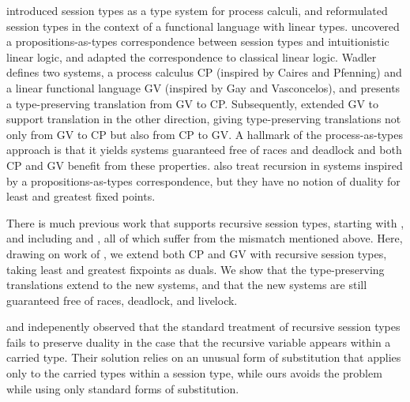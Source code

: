 \documentclass[orivec,envcountsame]{llncs}
\begin{document}
\citet{Honda93} introduced session types as a type system for process calculi, and
\citet{GayVasconcelos10} reformulated session types in the context of a functional language with
linear types. \citet{CairesPfenning10} uncovered a propositions-as-types correspondence between
session types and intuitionistic linear logic, and \citet{Wadler12} adapted the correspondence to
classical linear logic. Wadler defines two systems, a process calculus CP (inspired by Caires and
Pfenning) and a linear functional language GV (inspired by Gay and Vasconcelos), and presents a
type-preserving translation from GV to CP. Subsequently, \citet{LindleyM14} extended GV to support
translation in the other direction, giving type-preserving translations not only from GV to CP but
also from CP to GV. A hallmark of the process-as-types approach is that it yields systems guaranteed
free of races and deadlock and both CP and GV benefit from these properties.
\citet{Toninho13,Toninho14} also treat recursion in systems inspired by a propositions-as-types
correspondence, but they have no notion of duality for least and greatest fixed points.

There is much previous work that supports recursive session types, starting with \citet{Honda98},
and including \citet{Yoshida07} and \citet{DemangeonH11}, all of which suffer from the mismatch
mentioned above. Here, drawing on work of \citet{Baelde12}, we extend both CP and GV with recursive
session types, taking least and greatest fixpoints as duals. We show that the type-preserving
translations extend to the new systems, and that the new systems are still guaranteed free of races,
deadlock, and livelock.

\citet{Bono12} and \citet{Bernardi13} indepenently observed that the standard treatment of recursive
session types fails to preserve duality in the case that the recursive variable appears within a
carried type.  Their solution relies on an unusual form of substitution that applies only to the
carried types within a session type, while ours avoids the problem while using only standard forms
of substitution.
\end{document}
